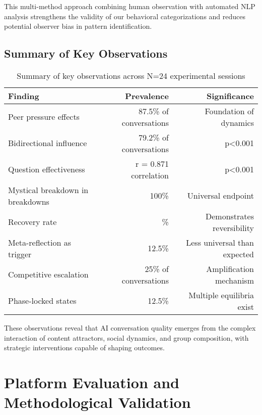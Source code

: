 \documentclass[11pt,letterpaper]{article}
\newcommand{\exponedataTotalSessionsRaw}{24}
\newcommand{\exponedataRecoverySessionsRaw}{9}
\newcommand{\exponedataTotalSessions}{N=\exponedataTotalSessionsRaw}
\newcommand{\exponedataRecoveryPercentage}{%
  \fpeval{round(\exponedataRecoverySessionsRaw / \exponedataTotalSessionsRaw * 100, 1)}\%
}
\newcommand{\exponedataPeerPressurePercentage}{87.5\%}
\newcommand{\exponedataBidirectionalPercentage}{79.2\%}
\newcommand{\exponedataQuestionCorrelation}{0.871}
\newcommand{\exponedataQuestionPValue}{p<0.001}
\newcommand{\exponedataBidirectionalPValue}{p<0.001}
\newcommand{\exponedataMetaReflectionTriggers}{12.5\%}
\newcommand{\exponedataCompetitiveEscalationPercentage}{25\%}
\newcommand{\exponedataMysticalBreakdownInBreakdowns}{100\%}
\newcommand{\exponedataPhaseLockedPercentage}{12.5\%}
\begin{document}
This multi-method approach combining human observation with automated NLP analysis strengthens the validity of our behavioral categorizations and reduces potential observer bias in pattern identification.

\subsection{Summary of Key Observations}

\begin{table}[h]
\centering
\begin{tabular}{lrr}
\toprule
\textbf{Finding} & \textbf{Prevalence} & \textbf{Significance} \\
\midrule
Peer pressure effects & \exponedataPeerPressurePercentage{} of conversations & Foundation of dynamics \\
Bidirectional influence & \exponedataBidirectionalPercentage{} of conversations & \exponedataBidirectionalPValue{} \\
Question effectiveness & r = \exponedataQuestionCorrelation{} correlation & \exponedataQuestionPValue{} \\
Mystical breakdown in breakdowns & \exponedataMysticalBreakdownInBreakdowns{} & Universal endpoint \\
Recovery rate & \exponedataRecoveryPercentage{} & Demonstrates reversibility \\
Meta-reflection as trigger & \exponedataMetaReflectionTriggers{} & Less universal than expected \\
Competitive escalation & \exponedataCompetitiveEscalationPercentage{} of conversations & Amplification mechanism \\
Phase-locked states & \exponedataPhaseLockedPercentage{} & Multiple equilibria exist \\
\bottomrule
\end{tabular}
\caption{Summary of key observations across \exponedataTotalSessions{} experimental sessions}
\label{tab:key_findings}
\end{table}

These observations reveal that AI conversation quality emerges from the complex interaction of content attractors, social dynamics, and group composition, with strategic interventions capable of shaping outcomes.

\section{Platform Evaluation and Methodological Validation}
\end{document}
